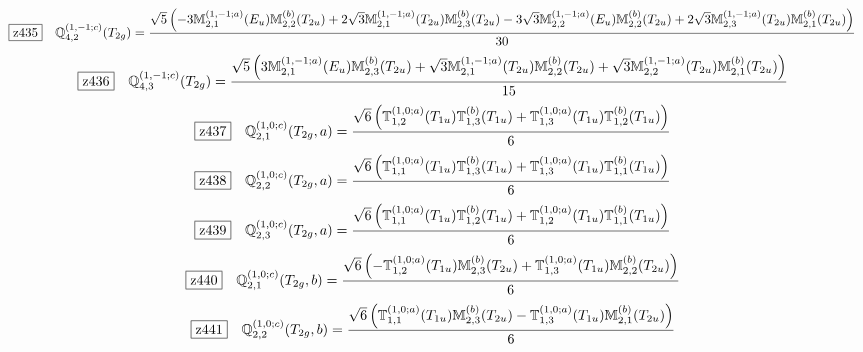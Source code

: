 \documentclass[fleqn,10pt,landscape]{jsarticle}
\begin{document}
\begin{dmath*}
\hspace*{3mm}\fbox{z435}\quad \mathbb{Q}_{4,2}^{(1,-1;c)}(T_{2g})=\frac{\sqrt{5} \left(- 3 \mathbb{M}_{2,1}^{(1,-1;a)}(E_{u}) \mathbb{M}_{2,2}^{(b)}(T_{2u}) + 2 \sqrt{3} \mathbb{M}_{2,1}^{(1,-1;a)}(T_{2u}) \mathbb{M}_{2,3}^{(b)}(T_{2u}) - 3 \sqrt{3} \mathbb{M}_{2,2}^{(1,-1;a)}(E_{u}) \mathbb{M}_{2,2}^{(b)}(T_{2u}) + 2 \sqrt{3} \mathbb{M}_{2,3}^{(1,-1;a)}(T_{2u}) \mathbb{M}_{2,1}^{(b)}(T_{2u})\right)}{30}
\end{dmath*}
\begin{dmath*}
\hspace*{3mm}\fbox{z436}\quad \mathbb{Q}_{4,3}^{(1,-1;c)}(T_{2g})=\frac{\sqrt{5} \left(3 \mathbb{M}_{2,1}^{(1,-1;a)}(E_{u}) \mathbb{M}_{2,3}^{(b)}(T_{2u}) + \sqrt{3} \mathbb{M}_{2,1}^{(1,-1;a)}(T_{2u}) \mathbb{M}_{2,2}^{(b)}(T_{2u}) + \sqrt{3} \mathbb{M}_{2,2}^{(1,-1;a)}(T_{2u}) \mathbb{M}_{2,1}^{(b)}(T_{2u})\right)}{15}
\end{dmath*}
\begin{dmath*}
\hspace*{3mm}\fbox{z437}\quad \mathbb{Q}_{2,1}^{(1,0;c)}(T_{2g},a)=\frac{\sqrt{6} \left(\mathbb{T}_{1,2}^{(1,0;a)}(T_{1u}) \mathbb{T}_{1,3}^{(b)}(T_{1u}) + \mathbb{T}_{1,3}^{(1,0;a)}(T_{1u}) \mathbb{T}_{1,2}^{(b)}(T_{1u})\right)}{6}
\end{dmath*}
\begin{dmath*}
\hspace*{3mm}\fbox{z438}\quad \mathbb{Q}_{2,2}^{(1,0;c)}(T_{2g},a)=\frac{\sqrt{6} \left(\mathbb{T}_{1,1}^{(1,0;a)}(T_{1u}) \mathbb{T}_{1,3}^{(b)}(T_{1u}) + \mathbb{T}_{1,3}^{(1,0;a)}(T_{1u}) \mathbb{T}_{1,1}^{(b)}(T_{1u})\right)}{6}
\end{dmath*}
\begin{dmath*}
\hspace*{3mm}\fbox{z439}\quad \mathbb{Q}_{2,3}^{(1,0;c)}(T_{2g},a)=\frac{\sqrt{6} \left(\mathbb{T}_{1,1}^{(1,0;a)}(T_{1u}) \mathbb{T}_{1,2}^{(b)}(T_{1u}) + \mathbb{T}_{1,2}^{(1,0;a)}(T_{1u}) \mathbb{T}_{1,1}^{(b)}(T_{1u})\right)}{6}
\end{dmath*}
\begin{dmath*}
\hspace*{3mm}\fbox{z440}\quad \mathbb{Q}_{2,1}^{(1,0;c)}(T_{2g},b)=\frac{\sqrt{6} \left(- \mathbb{T}_{1,2}^{(1,0;a)}(T_{1u}) \mathbb{M}_{2,3}^{(b)}(T_{2u}) + \mathbb{T}_{1,3}^{(1,0;a)}(T_{1u}) \mathbb{M}_{2,2}^{(b)}(T_{2u})\right)}{6}
\end{dmath*}
\begin{dmath*}
\hspace*{3mm}\fbox{z441}\quad \mathbb{Q}_{2,2}^{(1,0;c)}(T_{2g},b)=\frac{\sqrt{6} \left(\mathbb{T}_{1,1}^{(1,0;a)}(T_{1u}) \mathbb{M}_{2,3}^{(b)}(T_{2u}) - \mathbb{T}_{1,3}^{(1,0;a)}(T_{1u}) \mathbb{M}_{2,1}^{(b)}(T_{2u})\right)}{6}
\end{dmath*}
\end{document}
